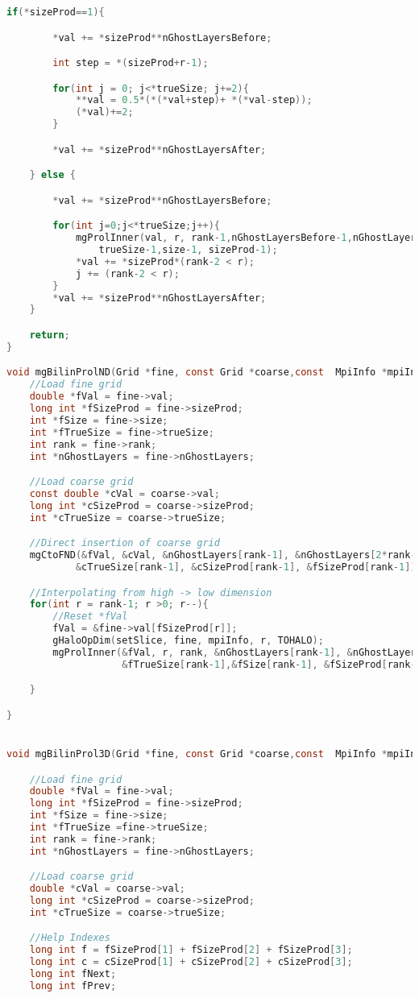 \begin{lstlisting}[language=c, caption = main routine]
	if(*sizeProd==1){

		*val += *sizeProd**nGhostLayersBefore;

		int step = *(sizeProd+r-1);

		for(int j = 0; j<*trueSize; j+=2){
			**val = 0.5*(*(*val+step)+ *(*val-step));
			(*val)+=2;
		}

		*val += *sizeProd**nGhostLayersAfter;

	} else {

		*val += *sizeProd**nGhostLayersBefore;

		for(int j=0;j<*trueSize;j++){
			mgProlInner(val, r, rank-1,nGhostLayersBefore-1,nGhostLayersAfter-1,
				trueSize-1,size-1, sizeProd-1);
			*val += *sizeProd*(rank-2 < r);
			j += (rank-2 < r);
		}
		*val += *sizeProd**nGhostLayersAfter;
	}

	return;
}

void mgBilinProlND(Grid *fine, const Grid *coarse,const  MpiInfo *mpiInfo){
	//Load fine grid
	double *fVal = fine->val;
	long int *fSizeProd = fine->sizeProd;
	int *fSize = fine->size;
	int *fTrueSize = fine->trueSize;
	int rank = fine->rank;
	int *nGhostLayers = fine->nGhostLayers;

	//Load coarse grid
	const double *cVal = coarse->val;
	long int *cSizeProd = coarse->sizeProd;
	int *cTrueSize = coarse->trueSize;

	//Direct insertion of coarse grid
	mgCtoFND(&fVal, &cVal, &nGhostLayers[rank-1], &nGhostLayers[2*rank-1],
			&cTrueSize[rank-1], &cSizeProd[rank-1], &fSizeProd[rank-1]);

	//Interpolating from high -> low dimension
	for(int r = rank-1; r >0; r--){
		//Reset *fVal
		fVal = &fine->val[fSizeProd[r]];
		gHaloOpDim(setSlice, fine, mpiInfo, r, TOHALO);
		mgProlInner(&fVal, r, rank, &nGhostLayers[rank-1], &nGhostLayers[2*rank-1],
					&fTrueSize[rank-1],&fSize[rank-1], &fSizeProd[rank-1]);

	}

}


void mgBilinProl3D(Grid *fine, const Grid *coarse,const  MpiInfo *mpiInfo){

	//Load fine grid
	double *fVal = fine->val;
	long int *fSizeProd = fine->sizeProd;
	int *fSize = fine->size;
	int *fTrueSize =fine->trueSize;
	int rank = fine->rank;
	int *nGhostLayers = fine->nGhostLayers;

	//Load coarse grid
	double *cVal = coarse->val;
	long int *cSizeProd = coarse->sizeProd;
	int *cTrueSize = coarse->trueSize;

	//Help Indexes
	long int f = fSizeProd[1] + fSizeProd[2] + fSizeProd[3];
	long int c = cSizeProd[1] + cSizeProd[2] + cSizeProd[3];
	long int fNext;
	long int fPrev;


\end{lstlisting}
